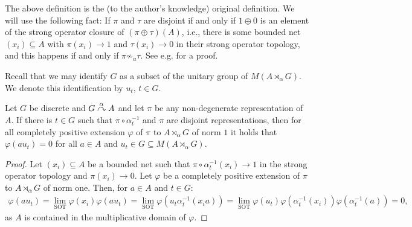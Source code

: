 \begin{remark}
	The above definition is the (to the author's knowledge) original definition. We will use the following fact: If $\pi$ and $\tau$ are disjoint if and only if $1 \oplus 0$ is an element of the strong operator closure of $(\pi \oplus \tau) (A)$, i.e., there is some bounded net $(x_i) \subseteq A$ with $\pi(x_i) \to 1$ and $\tau(x_i) \to 0$ in their strong operator topology, and this happens if and only if $\pi \not \sim _u \tau$. See e.g. \cite[Proposition 2.1.4]{arveson2012invitation} for a proof. 
\end{remark}
Recall that we may identify $G$ as a subset of the unitary group of $M(A \rtimes_\alpha G)$. We denote this identification by $u_t$, $t \in G$. 
\begin{lemma}
	Let $G$ be discrete and $G \stackrel{\alpha}{\curvearrowright} A$ and let $\pi$ be any non-degenerate representation of $A$. If there is $t \in G$ such that $\pi \circ \alpha_t^{-1}$ and $\pi$ are disjoint representations, then for all completely positive extension $\varphi$ of $\pi$ to $A \rtimes_\alpha G$ of norm $1$ it holds that $\varphi(a u_t) = 0$ for all $a \in A$ and $u_t \in G \subseteq M(A \rtimes_\alpha G)$.
	\label{ASlem1}
\end{lemma}
\begin{proof}
	Let $(x_i) \subseteq A$ be a bounded net such that $\pi  \circ \alpha_{t}^{-1}(x_i) \to 1$ in the strong operator topology and $\pi(x_i) \to 0$. Let $\varphi$ be a completely positive extension of $\pi$ to $A  \rtimes_\alpha G$ of norm one. Then, for $a \in A$ and $t \in G$:
	\begin{align*}
		\varphi(a u_t) = \lim_{\text{SOT}} \varphi(x_i )\varphi(a u_t) = \lim_{\text{SOT}} \varphi(u_t \alpha_{t}^{-1}(x_i a )) = \lim_{\text{SOT}} \varphi(u_t) \varphi(\alpha_t^{-1}(x_i))\varphi(\alpha_{t}^{-1}(a)) = 0,
	\end{align*}
	as $A$ is contained in the multiplicative domain of $\varphi$.
\end{proof}

